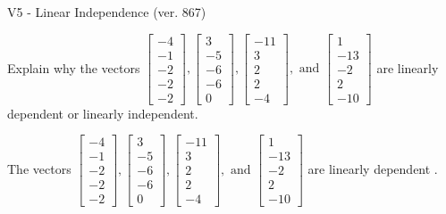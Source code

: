\begin{exercise}
  \begin{exerciseTitle}V5 - Linear Independence (ver. 867)\end{exerciseTitle}
  \begin{exerciseStatement}
    Explain why the vectors \(\left[\begin{array}{r}
-4 \\
-1 \\
-2 \\
-2 \\
-2
\end{array}\right] , \left[\begin{array}{r}
3 \\
-5 \\
-6 \\
-6 \\
0
\end{array}\right] , \left[\begin{array}{r}
-11 \\
3 \\
2 \\
2 \\
-4
\end{array}\right] , \text{ and } \left[\begin{array}{r}
1 \\
-13 \\
-2 \\
2 \\
-10
\end{array}\right]\) are linearly dependent or linearly independent.	


  \end{exerciseStatement}
  \begin{exerciseAnswer}
   The vectors \(\left[\begin{array}{r}
-4 \\
-1 \\
-2 \\
-2 \\
-2
\end{array}\right] , \left[\begin{array}{r}
3 \\
-5 \\
-6 \\
-6 \\
0
\end{array}\right] , \left[\begin{array}{r}
-11 \\
3 \\
2 \\
2 \\
-4
\end{array}\right] , \text{ and } \left[\begin{array}{r}
1 \\
-13 \\
-2 \\
2 \\
-10
\end{array}\right]\) are 
  	 linearly dependent  .
  


  \end{exerciseAnswer}
\end{exercise}
